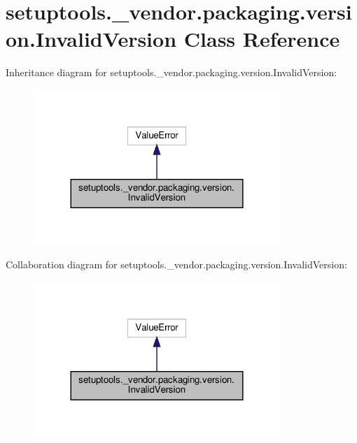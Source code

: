 \hypertarget{classsetuptools_1_1__vendor_1_1packaging_1_1version_1_1InvalidVersion}{}\section{setuptools.\+\_\+vendor.\+packaging.\+version.\+Invalid\+Version Class Reference}
\label{classsetuptools_1_1__vendor_1_1packaging_1_1version_1_1InvalidVersion}


Inheritance diagram for setuptools.\+\_\+vendor.\+packaging.\+version.\+Invalid\+Version\+:
\nopagebreak
\begin{figure}[H]
\begin{center}
\leavevmode
\includegraphics[width=264pt]{classsetuptools_1_1__vendor_1_1packaging_1_1version_1_1InvalidVersion__inherit__graph}
\end{center}
\end{figure}


Collaboration diagram for setuptools.\+\_\+vendor.\+packaging.\+version.\+Invalid\+Version\+:
\nopagebreak
\begin{figure}[H]
\begin{center}
\leavevmode
\includegraphics[width=264pt]{classsetuptools_1_1__vendor_1_1packaging_1_1version_1_1InvalidVersion__coll__graph}
\end{center}
\end{figure}


